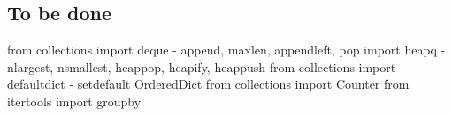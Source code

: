 \documentclass{charun}
\begin{document}
\begin{multicols*}{2}
\section{To be done}
from collections import deque - append, maxlen, appendleft, pop
import heapq - nlargest, nsmallest, heappop, heapify, heappush
from collections import defaultdict - setdefault
OrderedDict
from collections import Counter
from itertools import groupby

\end{multicols*}
\end{document}
